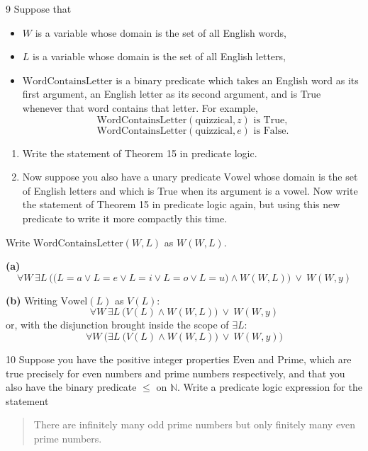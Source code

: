 \documentclass[11pt]{article}
\begin{document}
\begin{exercise}{9}
    Suppose that
    \begin{itemize}
        \item $W$ is a variable whose domain is the set of all English words,
        \item $L$ is a variable whose domain is the set of all English letters,
        \item $\text{WordContainsLetter}$ is a binary predicate which
            takes an English word as its first argument, an English
            letter as its second argument, and is True whenever that
            word contains that letter. For example,
            \[
            \text{WordContainsLetter}(\text{quizzical}, z) \text{ is True},
            \]
            \[
            \text{WordContainsLetter}(\text{quizzical}, e) \text{ is False}.
            \]
    \end{itemize}
    \begin{enumerate}[label=(\alph*)]
        \item Write the statement of Theorem 15 in predicate logic.
        \item Now suppose you also have a unary predicate $\text{Vowel}$
            whose domain is the set of English letters and which is
            True when its argument is a vowel. Now write the statement
            of Theorem 15 in predicate logic again, but using this new
            predicate to write it more compactly this time.
    \end{enumerate}
\end{exercise}

\begin{solution}
Write $\text{WordContainsLetter}(W,L)$ as $W(W,L)$.

\medskip
\noindent\textbf{(a)}
\[
\forall W\,\exists L\ \Big(\big(L=a\vee L=e\vee L=i\vee L=o\vee L=u\big)\wedge W(W,L)\Big)\ \vee\ W(W,y)
\]

\medskip
\noindent\textbf{(b)} Writing $\text{Vowel}(L)$ as $V(L)$:
\[
\forall W\,\exists L\ \Big(V(L)\wedge W(W,L)\Big)\ \vee\ W(W,y)
\]
or, with the disjunction brought inside the scope of $\exists L$:
\[
\forall W\ \Big(\exists L\ \big(V(L)\wedge W(W,L)\big)\ \vee\ W(W,y)\Big)
\]
\end{solution}

\begin{exercise}{10}
    Suppose you have the positive integer properties $\text{Even}$ and
    $\text{Prime}$, which are true precisely for even numbers and prime
    numbers respectively, and that you also have the binary predicate
    $\leq$ on $\mathbb{N}$. Write a predicate logic expression for the
    statement

    \begin{quote}
        There are infinitely many odd prime numbers but only finitely
        many even prime numbers.
    \end{quote}
\end{exercise}
\end{document}
